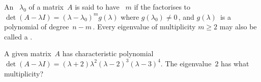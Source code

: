 \begin{definition} \label{def:eigmult}
An ~\(\lambda_0\) of a matrix~\(A\) is said to have ~\(m\) if the  factorises to \(\det(A-\lambda I)=(\lambda-\lambda_0)^mg(\lambda)\) where \(g(\lambda_0)\neq0\)\,, and \(g(\lambda)\)~is a polynomial of degree~\(n-m\)\,.
Every eigenvalue of multiplicity \(m\geq2\) may also be called a .
\end{definition}



\begin{activity}
A given matrix~\(A\) has characteristic polynomial \(\det(A-\lambda I)=(\lambda+2)\lambda^2(\lambda-2)^3(\lambda-3)^4\).
The eigenvalue~\(2\) has what multiplicity?
\end{activity}



